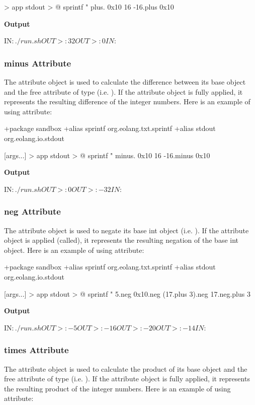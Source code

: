 \documentclass[12pt]{book}
\begin{document}
{\begin{ffcode}
[args...] > app
  stdout > @
    sprintf
      "%
      plus.
        0x10
        16
      -16.plus 0x10
\end{ffcode}
\textbf{Output}
\begin{ffcode}
IN$: ./run.sh
OUT>: 32
OUT>: 0
IN$:
\end{ffcode}

\subsubsection{minus Attribute}
The  attribute object is used to calculate the difference between its base  object and the free attribute  of type  (i.e. ).
If the  attribute object is fully applied, it represents the resulting difference of the integer numbers. Here is an example of using  attribute:

\begin{ffcode}
+package sandbox
+alias sprintf org.eolang.txt.sprintf
+alias stdout org.eolang.io.stdout

[args...] > app
  stdout > @
    sprintf
      "%
      minus.
        0x10
        16
      -16.minus 0x10
\end{ffcode}
\textbf{Output}
\begin{ffcode}
IN$: ./run.sh
OUT>: 0
OUT>: -32
IN$:
\end{ffcode}

\subsubsection{neg Attribute}
The  attribute object is used to negate its base int object (i.e. \ff{-$}).
If the  attribute object is applied (called), it represents the resulting negation of the base int object. Here is an example of using  attribute:

\begin{ffcode}
+package sandbox
+alias sprintf org.eolang.txt.sprintf
+alias stdout org.eolang.io.stdout

[args...] > app
  stdout > @
    sprintf
      "%
      5.neg
      0x10.neg
      (17.plus 3).neg
      17.neg.plus 3
\end{ffcode}
\textbf{Output}
\begin{ffcode}
IN$: ./run.sh
OUT>: -5
OUT>: -16
OUT>: -20
OUT>: -14
IN$:
\end{ffcode}

\subsubsection{times Attribute}
The  attribute object is used to calculate the product of its base  object and the free attribute  of type  (i.e. ).
If the  attribute object is fully applied, it represents the resulting product of the integer numbers. Here is an example of using  attribute:

}
\end{document}
